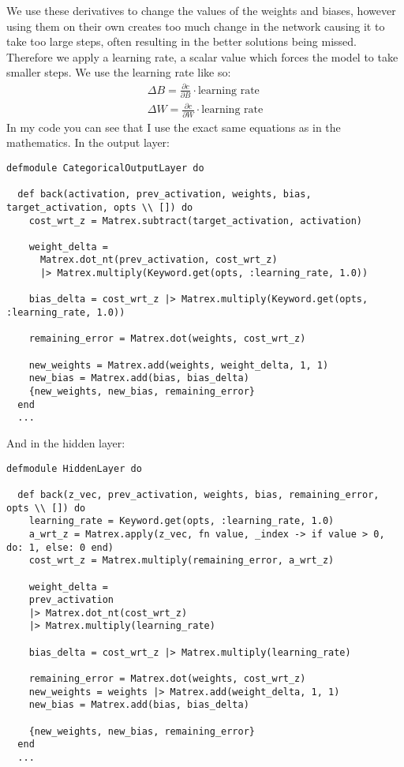 We use these derivatives to change the values of the weights and biases, however
using them on their own creates too much change in the network causing it to
take too large steps, often resulting in the better solutions being missed.
Therefore we apply a learning rate, a scalar value which forces the model to take smaller steps.
We use the learning rate like so:
\begin{equation}
    \begin{aligned}
        \Delta B = \frac{\partial c}{\partial B} \cdot \text{learning rate}\\[1em]
        \Delta W = \frac{\partial c}{\partial W} \cdot \text{learning rate} 
    \end{aligned}
\end{equation}
\clearpage
In my code you can see that I use the exact same equations as in the mathematics.
In the output layer:
\begin{lstlisting}
defmodule CategoricalOutputLayer do

  def back(activation, prev_activation, weights, bias, target_activation, opts \\ []) do
    cost_wrt_z = Matrex.subtract(target_activation, activation)

    weight_delta =
      Matrex.dot_nt(prev_activation, cost_wrt_z)
      |> Matrex.multiply(Keyword.get(opts, :learning_rate, 1.0))

    bias_delta = cost_wrt_z |> Matrex.multiply(Keyword.get(opts, :learning_rate, 1.0))

    remaining_error = Matrex.dot(weights, cost_wrt_z)

    new_weights = Matrex.add(weights, weight_delta, 1, 1)
    new_bias = Matrex.add(bias, bias_delta)
    {new_weights, new_bias, remaining_error}
  end
  ...
\end{lstlisting}

And in the hidden layer:
\begin{lstlisting}[basicstyle=\linespread{0.8}\ttfamily\footnotesize]
defmodule HiddenLayer do

  def back(z_vec, prev_activation, weights, bias, remaining_error, opts \\ []) do
    learning_rate = Keyword.get(opts, :learning_rate, 1.0)
    a_wrt_z = Matrex.apply(z_vec, fn value, _index -> if value > 0, do: 1, else: 0 end)
    cost_wrt_z = Matrex.multiply(remaining_error, a_wrt_z)

    weight_delta =
    prev_activation
    |> Matrex.dot_nt(cost_wrt_z)
    |> Matrex.multiply(learning_rate)

    bias_delta = cost_wrt_z |> Matrex.multiply(learning_rate)

    remaining_error = Matrex.dot(weights, cost_wrt_z)
    new_weights = weights |> Matrex.add(weight_delta, 1, 1)
    new_bias = Matrex.add(bias, bias_delta)

    {new_weights, new_bias, remaining_error}
  end
  ...
\end{lstlisting}


